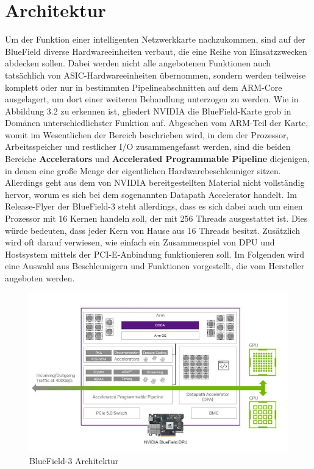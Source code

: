 \section{Architektur}
Um der Funktion einer intelligenten Netzwerkkarte nachzukommen, sind auf der BlueField diverse Hardwareeinheiten verbaut, die eine Reihe von Einsatzzwecken abdecken sollen. Dabei werden nicht alle angebotenen Funktionen auch tatsächlich von ASIC-Hardwareeinheiten übernommen, sondern werden teilweise komplett oder nur in bestimmten Pipelineabschnitten auf dem ARM-Core ausgelagert, um dort einer weiteren Behandlung unterzogen zu werden. Wie in Abbildung 3.2 zu erkennen ist, gliedert NVIDIA die BlueField-Karte grob in Domänen unterschiedlichster Funktion auf. Abgesehen vom ARM-Teil der Karte, womit im Wesentlichen der Bereich beschrieben wird, in dem der Prozessor, Arbeitsspeicher und restlicher I/O zusammengefasst werden, sind die beiden Bereiche \textbf{Accelerators} und \textbf{Accelerated Programmable Pipeline} diejenigen, in denen eine große Menge der eigentlichen Hardwarebeschleuniger sitzen. Allerdings geht aus dem von NVIDIA bereitgestellten Material nicht vollständig hervor, worum es sich bei dem sogenannten Datapath Accelerator handelt. \cite{nvidia_bluefield_dpu}  Im Release-Flyer der BlueField-3 steht allerdings, dass es sich dabei auch um einen Prozessor mit 16 Kernen handeln soll, der mit 256 Threads ausgestattet ist. Dies würde bedeuten, dass jeder Kern von Hause aus 16 Threads besitzt. Zusätzlich wird oft darauf verwiesen, wie einfach ein Zusammenspiel von DPU und Hostsystem mittels der PCI-E-Anbindung funktionieren soll. Im Folgenden wird eine Auswahl aus Beschleunigern und Funktionen vorgestellt, die vom Hersteller  angeboten werden. \cite{nvidia_bluefield_dpu} 
\begin{figure}
    \centering
    \includegraphics[width=1\linewidth]{images/nvda-bluefield-dpu.png}
    \caption{BlueField-3 Architektur}
    \label{fig:enter-label}
\end{figure}
